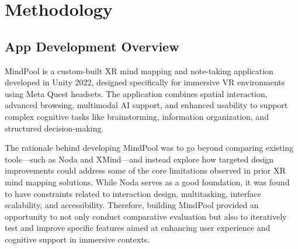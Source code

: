 \documentclass{CPP}
\begin{document}











\chapter{Methodology}


\section{App Development Overview}

MindPool is a custom-built XR mind mapping and note-taking application developed in Unity 2022, designed specifically for immersive VR environments using Meta Quest headsets. The application combines spatial interaction, advanced browsing, multimodal AI support, and enhanced usability to support complex cognitive tasks like brainstorming, information organization, and structured decision-making.

The rationale behind developing MindPool was to go beyond comparing existing tools—such as Noda and XMind—and instead explore how targeted design improvements could address some of the core limitations observed in prior XR mind mapping solutions. While Noda serves as a good foundation, it was found to have constraints related to interaction design, multitasking, interface scalability, and accessibility. Therefore, building MindPool provided an opportunity to not only conduct comparative evaluation but also to iteratively test and improve specific features aimed at enhancing user experience and cognitive support in immersive contexts.
\end{document}
